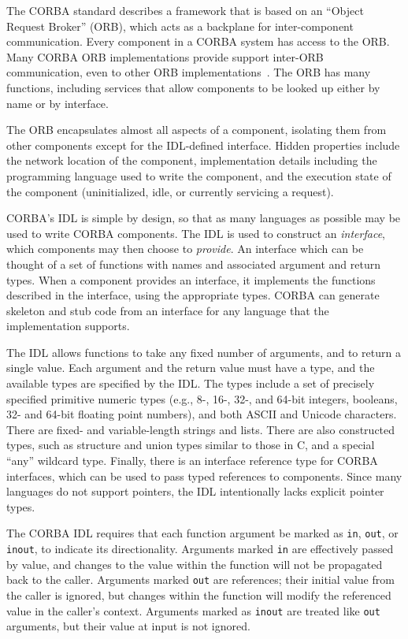 The CORBA standard describes a framework that is based on an ``Object Request Broker'' (ORB), which acts as a backplane for inter-component communication. Every component in a CORBA system has access to the ORB. Many CORBA ORB implementations provide support inter-ORB communication, even to other ORB implementations~\cite{vinoski97corba}. The ORB has many functions, including services that allow components to be looked up either by name or by interface.

The ORB encapsulates almost all aspects of a component, isolating them from other components except for the IDL-defined interface. Hidden properties include the network location of the component, implementation details including the programming language used to write the component, and the execution state of the component (uninitialized, idle, or currently servicing a request).

CORBA's IDL is simple by design, so that as many languages as possible may be used to write CORBA components. The IDL is used to construct an \emph{interface}, which components may then choose to \emph{provide}. An interface which can be thought of a set of functions with names and associated argument and return types. When a component provides an interface, it implements the functions described in the interface, using the appropriate types. CORBA can generate skeleton and stub code from an interface for any language that the implementation supports.

The IDL allows functions to take any fixed number of arguments, and to return a single value. Each argument and the return value must have a type, and the available types are specified by the IDL. The types include a set of precisely specified primitive numeric types (e.g., 8-, 16-, 32-, and 64-bit integers, booleans, 32- and 64-bit floating point numbers), and both ASCII and Unicode characters. There are fixed- and variable-length strings and lists. There are also constructed types, such as structure and union types similar to those in C, and a special ``any'' wildcard type. Finally, there is an interface reference type for CORBA interfaces, which can be used to pass typed references to components. Since many languages do not support pointers, the IDL intentionally lacks explicit pointer types.

The CORBA IDL requires that each function argument be marked as
\texttt{in}, \texttt{out}, or \texttt{inout}, to indicate its
directionality. Arguments marked \texttt{in} are effectively
passed by value, and changes to the value within the function will
not be propagated back to the caller. Arguments marked
\texttt{out} are references; their initial value from the caller
is ignored, but changes within the function will modify the
referenced value in the caller's context. Arguments marked as
\texttt{inout} are treated like \texttt{out} arguments, but their
value at input is not ignored.

